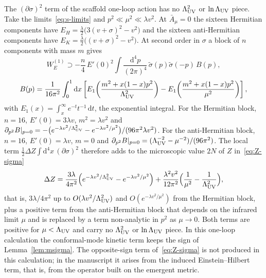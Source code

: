 The \((\partial\sigma)^2\) term of the scaffold one-loop action has no
\(\Lambda_{\mathrm{UV}}^2\) or \(\ln\Lambda_{\mathrm{UV}}\) piece. Take the limits~\eqref{eq:s-limits}
and \(p^2\ll\mu^2\ll\lambda v^2\). At \(\bar A_\mu=0\) the sixteen
Hermitian components have
\(E_H=\tfrac\lambda2\bigl(3(v+\sigma)^2-v^2\bigr)\) and the sixteen
anti-Hermitian components have
\(E_K=\tfrac\lambda2\bigl((v+\sigma)^2-v^2\bigr)\). At second order in
\(\sigma\) a block of \(n\) components with mass \(m\) gives
\[
  W_E^{(1)}\supset
  -\frac n4\,E'(0)^2\int\frac{\mathrm{d}^4p}{(2\pi)^4}\,
   \tilde\sigma(p)\tilde\sigma(-p)\,B(p),
\]
\[
  B(p)=\frac{1}{16\pi^2}\int_0^1\mathrm{d}x\left[
   E_1\!\left(\frac{m^2+x(1-x)p^2}{\Lambda_{\mathrm{UV}}^2}\right)
   -E_1\!\left(\frac{m^2+x(1-x)p^2}{\mu^2}\right)\right],
\]
with \(E_1(x)=\int_x^\infty e^{-t}t^{-1}\,\mathrm dt\), the exponential
integral. For the Hermitian block, \(n=16\), \(E'(0)=3\lambda v\),
\(m^2=\lambda v^2\) and
\(\partial_{p^2}B|_{p=0}=-\bigl(e^{-\lambda v^2/\Lambda_{\mathrm{UV}}^2}
-e^{-\lambda v^2/\mu^2}\bigr)/(96\pi^2\lambda v^2)\). For the
anti-Hermitian block, \(n=16\), \(E'(0)=\lambda v\), \(m=0\) and
\(\partial_{p^2}B|_{p=0}=(\Lambda_{\mathrm{UV}}^{-2}-\mu^{-2})/(96\pi^2)\). The local
term \(\tfrac12\Delta Z\int\mathrm{d}^4x\,(\partial\sigma)^2\) therefore
adds to the microscopic value \(2N\) of \(Z\) in~\eqref{eq:Z-sigma}
\[
  \Delta Z=\frac{3\lambda}{4\pi^2}
   \Bigl(e^{-\lambda v^2/\Lambda_{\mathrm{UV}}^2}-e^{-\lambda v^2/\mu^2}\Bigr)
   +\frac{\lambda^2v^2}{12\pi^2}\Bigl(\frac1{\mu^2}-\frac1{\Lambda_{\mathrm{UV}}^2}\Bigr),
\]
that is, \(3\lambda/4\pi^2\) up to \(O(\lambda v^2/\Lambda_{\mathrm{UV}}^2)\) and
\(O(e^{-\lambda v^2/\mu^2})\) from the Hermitian block, plus a positive
term from the anti-Hermitian block that depends on the infrared limit
\(\mu\) and is replaced by a term non-analytic in \(p^2\) as
\(\mu\to0\). Both terms are positive for \(\mu<\Lambda_{\mathrm{UV}}\) and carry
no \(\Lambda_{\mathrm{UV}}^2\) or \(\ln\Lambda_{\mathrm{UV}}\) piece. In this one-loop calculation the
conformal-mode kinetic term keeps the sign of Lemma~\ref{lem:msigma}.
The opposite-sign term of~\eqref{eq:Z-sigma} is not produced in this
calculation; in the manuscript it arises from the induced
Einstein--Hilbert term, that is, from the operator built on the
emergent metric.

